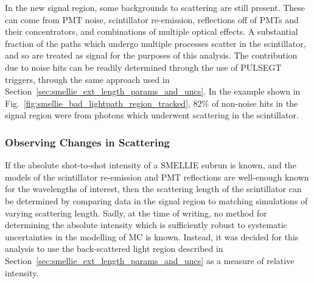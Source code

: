 \begin{figure}
    \centering
    \caption[]{}
    \label{fig:smellie_bad_lightpath_region_beamprofile_comparison}
\end{figure}

In the new signal region, some backgrounds to scattering are still present. These can come from PMT noise, scintillator re-emission, reflections off of PMTs and their concentrators, and combinations of multiple optical effects. A substantial fraction of the paths which undergo multiple processes scatter in the scintillator, and so are treated as signal for the purposes of this analysis. The contribution due to noise hits can be readily determined through the use of PULSEGT triggers, through the same approach used in Section~\ref{sec:smellie_ext_length_params_and_uncs}. In the example shown in Fig.~\ref{fig:smellie_bad_lightpath_region_tracked}, 82\% of non-noise hits in the signal region were from photons which underwent scattering in the scintillator.

\subsubsection{Observing Changes in Scattering}
If the absolute shot-to-shot intensity of a SMELLIE subrun is known, and the models of the scintillator re-emission and PMT reflections are well-enough known for the wavelengths of interest, then the scattering length of the scintillator can be determined by comparing data in the signal region to matching simulations of varying scattering length. Sadly, at the time of writing, no method for determining the absolute intensity which is sufficiently robust to systematic uncertainties in the modelling of MC is known. Instead, it was decided for this analysis to use the back-scattered light region described in Section~\ref{sec:smellie_ext_length_params_and_uncs} as a measure of relative intensity.

